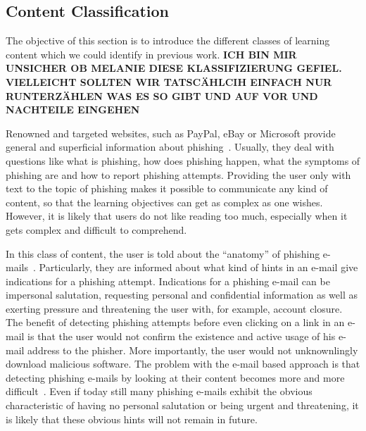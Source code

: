 \subsection{Content Classification}
The objective of this section is to introduce the different classes of learning content which we could identify in previous work.
\textbf{ICH BIN MIR UNSICHER OB MELANIE DIESE KLASSIFIZIERUNG GEFIEL. VIELLEICHT SOLLTEN WIR TATSCÄHLCIH EINFACH NUR RUNTERZÄHLEN WAS ES SO GIBT UND AUF VOR UND NACHTEILE EINGEHEN}
\begin{description}[leftmargin=0cm]
	\item[General Knowledge Transfer] Renowned and targeted websites, such as PayPal, eBay or Microsoft provide general and superficial information about phishing~\cite{generalknowledgemicrosoft, generalknowledgepaypal, generalknowledgeebay}. Usually, they deal with questions like what is phishing, how does phishing happen, what the symptoms of phishing are and how to report phishing attempts. Providing the user only with text to the topic of phishing makes it possible to communicate any kind of content, so that the learning objectives can get as complex as one wishes. However, it is likely that users do not like reading too much, especially when it gets complex and difficult to comprehend.
	\item[E-Mail Based Knowledge] In this class of content, the user is told about the ``anatomy'' of phishing e-mails~\cite{antiphishingphyllis, sonicwall}. Particularly, they are informed about what kind of hints in an e-mail give indications for a phishing attempt. Indications for a phishing e-mail can be impersonal salutation, requesting personal and confidential information as well as exerting pressure and threatening the user with, for example, account closure. The benefit of detecting phishing attempts before even clicking on a link in an e-mail is that the user would not confirm the existence and active usage of his e-mail address to the phisher. More importantly, the user would not unknownlingly download malicious software. The problem with the e-mail based approach is that detecting phishing e-mails by looking at their content becomes more and more difficult~\cite{microsoftphishing,spamfighter}. Even if today still many phishing e-mails exhibit the obvious characteristic of having no personal salutation or being urgent and threatening, it is likely that these obvious hints will not remain in future.

\end{description}
